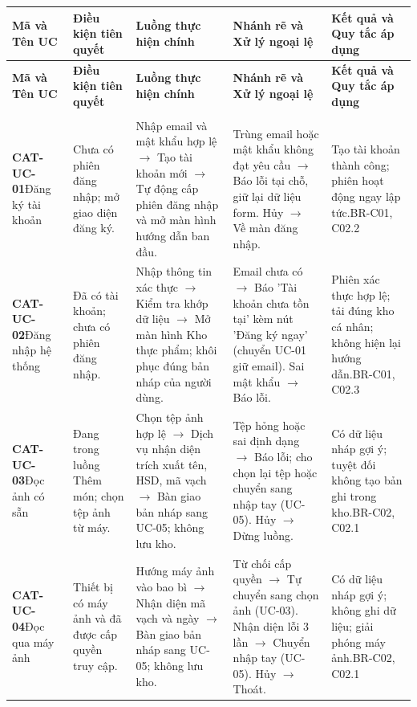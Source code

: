 \documentclass[10pt,a4paper]{article}
\begin{document}
\begingroup
\small
\setlength{\tabcolsep}{4.5pt}
\begin{longtable}{|p{2.1cm}|p{2.3cm}|p{3.5cm}|p{3.8cm}|p{3.0cm}|}
\hline
\textbf{Mã và Tên UC} & \textbf{Điều kiện tiên quyết} & \textbf{Luồng thực hiện chính} & \textbf{Nhánh rẽ và Xử lý ngoại lệ} & \textbf{Kết quả và Quy tắc áp dụng} \\
\hline
\endfirsthead
\hline
\textbf{Mã và Tên UC} & \textbf{Điều kiện tiên quyết} & \textbf{Luồng thực hiện chính} & \textbf{Nhánh rẽ và Xử lý ngoại lệ} & \textbf{Kết quả và Quy tắc áp dụng} \\
\hline
\endhead
\hline
\endfoot
\hline
\endlastfoot

\multicolumn{5}{|l|}{\textbf{\color{primary}NHÓM NỀN TẢNG VÀ F01: THÊM THỰC PHẨM VÀO KHO}} \\
\hline
\textbf{CAT-UC-01}\newline Đăng ký tài khoản & Chưa có phiên đăng nhập; mở giao diện đăng ký. & Nhập email và mật khẩu hợp lệ $\to$ Tạo tài khoản mới $\to$ Tự động cấp phiên đăng nhập và mở màn hình hướng dẫn ban đầu. & Trùng email hoặc mật khẩu không đạt yêu cầu $\to$ Báo lỗi tại chỗ, giữ lại dữ liệu form. Hủy $\to$ Về màn đăng nhập. & Tạo tài khoản thành công; phiên hoạt động ngay lập tức.\newline BR-C01, C02.2 \\
\hline
\textbf{CAT-UC-02}\newline Đăng nhập hệ thống & Đã có tài khoản; chưa có phiên đăng nhập. & Nhập thông tin xác thực $\to$ Kiểm tra khớp dữ liệu $\to$ Mở màn hình Kho thực phẩm; khôi phục đúng bản nháp của người dùng. & Email chưa có $\to$ Báo 'Tài khoản chưa tồn tại' kèm nút 'Đăng ký ngay' (chuyển UC-01 giữ email). Sai mật khẩu $\to$ Báo lỗi. & Phiên xác thực hợp lệ; tải đúng kho cá nhân; không hiện lại hướng dẫn.\newline BR-C01, C02.3 \\
\hline
\textbf{CAT-UC-03}\newline Đọc ảnh có sẵn & Đang trong luồng Thêm món; chọn tệp ảnh từ máy. & Chọn tệp ảnh hợp lệ $\to$ Dịch vụ nhận diện trích xuất tên, HSD, mã vạch $\to$ Bàn giao bản nháp sang UC-05; không lưu kho. & Tệp hỏng hoặc sai định dạng $\to$ Báo lỗi; cho chọn lại tệp hoặc chuyển sang nhập tay (UC-05). Hủy $\to$ Dừng luồng. & Có dữ liệu nháp gợi ý; tuyệt đối không tạo bản ghi trong kho.\newline BR-C02, C02.1 \\
\hline
\textbf{CAT-UC-04}\newline Đọc qua máy ảnh & Thiết bị có máy ảnh và đã được cấp quyền truy cập. & Hướng máy ảnh vào bao bì $\to$ Nhận diện mã vạch và ngày $\to$ Bàn giao bản nháp sang UC-05; không lưu kho. & Từ chối cấp quyền $\to$ Tự chuyển sang chọn ảnh (UC-03). Nhận diện lỗi 3 lần $\to$ Chuyển nhập tay (UC-05). Hủy $\to$ Thoát. & Có dữ liệu nháp gợi ý; không ghi dữ liệu; giải phóng máy ảnh.\newline BR-C02, C02.1 \\

\end{longtable}
\end{document}
